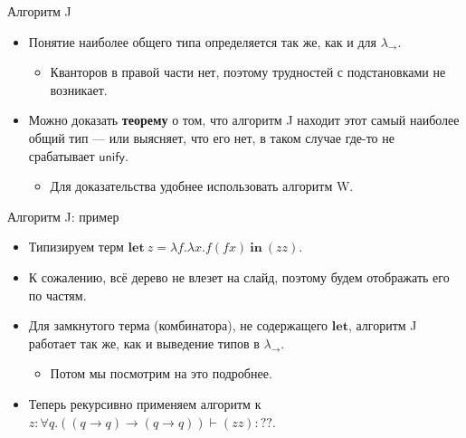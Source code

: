 \documentclass[xcolor=dvipsnames]{beamer}
\newcommand{\letin}[2]{\mathbf{let}\ {#1}\ \mathbf{in}\ {#2}}
\begin{document}
\begin{frame}{Алгоритм J}

\begin{itemize}[<+->]
 \item Понятие наиболее общего типа определяется так же, как и для $\lambda_\to$.
 \begin{itemize}[<+->]
 \item Кванторов в правой части нет, поэтому трудностей с подстановками не возникает.
 \end{itemize}
 \item Можно доказать {\bf теорему} о том, что алгоритм J находит этот самый наиболее общий тип --- или выясняет, что его нет, в таком случае где-то не срабатывает $\mathsf{unify}$.
 \begin{itemize}
 \item Для доказательства удобнее использовать алгоритм W.
 \end{itemize}
\end{itemize}

 
 
\end{frame}

\begin{frame}{Алгоритм J: пример}

\begin{itemize}
 \item Типизируем терм $\letin{z = \lambda f. \lambda x. f (f x)}{(zz)}$.
 \item<2-> К сожалению, всё дерево не влезет на слайд, поэтому будем отображать его по частям.
\end{itemize}
\visible<3->{
\[
 \infer[\mathrm{Let}]
 {\vdash_J \bigl(\letin{z = \lambda f. \lambda x. f (f x)}{(zz)} \bigr) : \boldsymbol{?} }
 {\vdash_J \bigl(\lambda f. \lambda x. f (f x)) : \only<1-4>{A}\only<5->{(q \to q) \to (q \to q)}
 & \qquad z : \forall \bar{\Gamma}. A \vdash_J (zz) : \boldsymbol{??} }
\]
}
\vspace*{-1em}
\begin{itemize}
 \item<4-> Для замкнутого терма (комбинатора), не содержащего $\mathbf{let}$, алгоритм J работает так же, как и выведение типов в $\lambda_\to$.
 \begin{itemize}
 \item<6-> Потом мы посмотрим на это подробнее.
 \end{itemize}
 \item<7-> Теперь рекурсивно применяем алгоритм к $z : \forall q. ((q \to q) \to (q \to q)) \vdash (zz) : \boldsymbol{??}$.
\end{itemize}

 
\end{frame}
\end{document}
